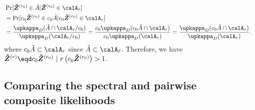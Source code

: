 \documentclass[12pt]{article}
\begin{document}
    \begin{align*}
        & \Pr[\bm{\tilde Z}^{(r_0)}\in \tilde A | \bm{\tilde Z}^{(r_0)} \in \calA_{\tilde r} ] \\
        &= \Pr[c_0\bm{\tilde Z}^{(r_0)}\in c_0\tilde A | c_0\bm{\tilde Z}^{(r_0)} \in \calA_{r} ] \\
        &= \frac{\upkappa_D(\tilde A \cap \calA_r/c_0)}{\upkappa_D(\calA_{r}/c_0)} = \frac{c_0\upkappa_D(c_0\tilde A \cap \calA_r)}{c_0\upkappa_D(\calA_{r})} = \frac{\upkappa_D(c_0\tilde A \cap \calA_r)}{\upkappa_D(\calA_{r})}. 
    \end{align*}
    where $c_0\tilde A\subset \calA_{r}$ since $\tilde A\subset \calA_{\tilde r}$. Therefore, we have $\bm{\tilde Z}^{(r)}\eqd c_0\bm{\tilde Z}^{(r_0)}\ | \ r\left(c_0\bm{\tilde Z}^{(r_0)}\right) > 1 $.


\subsection{Comparing the spectral and pairwise composite likelihoods}
\end{document}

